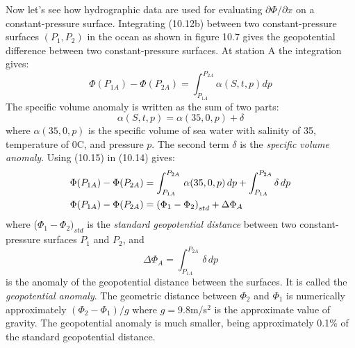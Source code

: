 Now let's see how hydrographic data are used
for evaluating $\partial \Phi/\partial x$ on a constant-pressure
surface. Integrating (10.12b) between two constant-pressure surfaces
$\left( P_1 , P_2 \right)$ in the ocean as shown in figure 10.7 gives
the geopotential difference between two constant-pressure surfaces. At
station A the integration gives:
\begin{equation}
\Phi\left(P_{1A}\right)-\Phi\left(P_{2A}\right)=\int_{P_{1A}}^{P_{2A}}
\alpha\left(S,t,p\right)dp
\end{equation}
The specific volume anomaly is written as the sum of two parts:
\begin{equation}
\alpha(S,t,p)=\alpha(35,0,p)+\delta
\end{equation}
where $\alpha (35,0,p)$ is the specific volume of sea water with
salinity of 35, temperature of 0\degrees C, and pressure $p$. The
second term $\delta$ is the \textit{specific volume
  anomaly}. Using (10.15) in
(10.14) gives:
\begin{align}
\Phi(P_{1A})-\Phi(P_{2A})&=\int_{P_{1A}}^{P_{2A}}\,\alpha(35,0,p)\, dp +\int_{P_{1A}}^{P_{2A}}
\delta \,dp \notag \\
\Phi(P_{1A})-\Phi(P_{2A})&=\left(\Phi_1-\Phi_2 \right)_{std}
+\Delta\Phi_A \notag
\end{align}
where ($\Phi_1-\Phi_2 )_{std}$ is the \textit{standard geopotential
  distance} between two
constant-pressure surfaces $P_1$ and $P_2$, and
\begin{equation}
\Delta\Phi_A =\int_{P_{1A}}^{P_{2A}} \,\delta\, dp
\end{equation}
is the anomaly of the geopotential distance between the surfaces. It
is called the \textit{geopotential
  anomaly}. The geometric distance
between $\Phi_2$ and $\Phi_1$ is numerically approximately $(\Phi_2 -
\Phi_1) /g$ where $g= 9.8$m/s$^2$ is the approximate value of
gravity. The geopotential anomaly is much smaller, being approximately
0.1\% of the standard geopotential distance.

